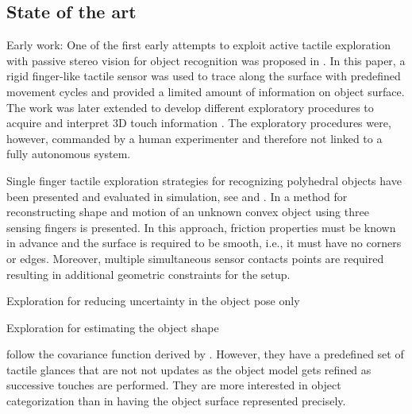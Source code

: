 \subsection{State of the art}
\label{sec:SoA}

{\color{red} Early work:} One of the first early attempts to exploit active tactile exploration with passive stereo vision for object recognition was proposed in \citet{Allen1987Robotic}. In this paper, a rigid finger-like tactile sensor was used to trace along the surface with predefined movement cycles and provided a limited amount of information on object surface. The work was later extended to develop different exploratory procedures to acquire and interpret 3D touch information \citet{Allen1990Acquisition}. The exploratory procedures were, however, commanded by a human experimenter and therefore not linked to a fully autonomous system.
 
Single finger tactile exploration strategies for recognizing polyhedral objects have been presented and evaluated in simulation, see \citet{Roberts1990ICRA} and \citet{Caselli1996ICRA}. In \citet{Moll2003STAR} a method for reconstructing shape and motion of an unknown convex object using three sensing fingers is presented. In this approach, friction properties must be known in advance and the surface is required to be smooth, i.e., it must have no corners or edges. Moreover, multiple simultaneous sensor contacts points are required resulting in additional geometric constraints for the setup.
 

{\color{red} Exploration for reducing uncertainty in the object pose only}

\citet{Petrovskaya2011Global}

{\color{red} Exploration for estimating the object shape}

\citet{Bjorkman2013Enhancing} follow the covariance function derived by \citet{Williams2007Gaussian}. However, they have a predefined set of tactile glances that are not not updates as the object model gets refined as successive touches are performed. They are more interested in object categorization than in having the object surface represented precisely.

